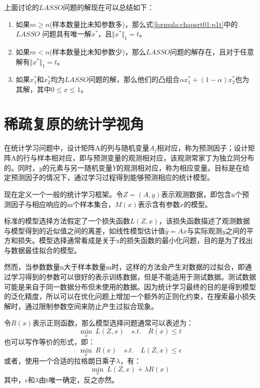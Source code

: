上面讨论的$ LASSO $问题的解现在可以总结如下：
\begin{theorem}[Osborne et al., 2000b]\quad\par
\begin{enumerate}
	\item 如果$ m\geq n$(样本数量比未知参数多)，那么式\ref{formula:chapsrt01:p1t}中的$ LASSO$ 问题具有唯一解$ x^*$，且$ \Vert x^*\Vert_1 =t $。
	\item 如果$ m<n $(样本数量比未知参数少)，那么$ LASSO $问题的解存在，且对于任意解有$ \Vert x^*\Vert_1 =t $。
	\item 如果$ x_1^* $和$ x_2^* $均为$ LASSO $问题的解，那么他们的凸组合$\alpha x_1^* +(1-\alpha)x_2^* $也为其解，其中$ 0\leq x\leq 1 $。
\end{enumerate}
\end{theorem}


\section{稀疏复原的统计学视角}

在统计学习问题中，设计矩阵A的列与随机变量$ A_j $相对应，称为预测因子；设计矩阵A的行与样本相对应，即与预测变量的观测相对应，该观测常家丁为独立同分布的。同时，$ y $的元素与另一随机变量$ Y $的观测相对应，称为相应变量。目标是在给定预测因子的情况下，通过学习过程得到能够预测相应的统计模型。

现在定义一个一般的统计学习框架。令$ Z=(A,y) $表示观测数据，即包含n个预测因子与相应响应的m个样本集合，$ M(x) $表示含有参数$ x $的模型。

标准的模型选择方法假定了一个损失函数$ L(Z,x) $，该损失函数描述了观测数据与模型得到的近似值之间的离差，如线性模型估计值$ \hat{y}=Ax $与实际观测$ y $之间的平方和损失。模型选择通常看成是关于x的损失函数的最小化问题，目的是为了找出与数据最佳拟合的模型。

然而，当参数数量n大于样本数量m时，这样的方法会产生对数据的过拟合，即通过学习得到的参数可以很好的表示训练数据，但是不能适用于测试数据。测试数据可能是来自于同一数据分布但未使用的数据。因为统计学习最终的目的是得到模型的泛化精度，所以可以在优化问题上增加一个额外的正则化约束，在搜索最小损失解时，通过限制参数空间来防止产生过拟合现象。

令$ R(x) $表示正则函数，那么模型选择问题通常可以表述为：
\begin{equation}\label{key}
\min_{x}\:  L(Z,x)\quad s.t.\quad R(x)\leq t
\end{equation}
也可以写作等价的形式，即：
\begin{equation}\label{key}
\min_{x}\: R(x) \quad  s.t.\quad L(Z,x)\leq \epsilon
\end{equation}
或者，使用一个合适的拉格朗日乘子$\lambda $，有：
\begin{equation}\label{key}
\min_{x}\:  L(Z,x)+\lambda R(x)
\end{equation}
其中，$ \epsilon $和$ \lambda $由t唯一确定，反之亦然。

